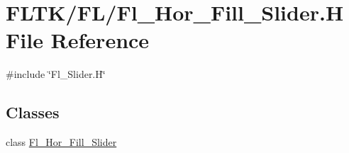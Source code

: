 \hypertarget{_fl___hor___fill___slider_8_h}{}\section{F\+L\+T\+K/\+F\+L/\+Fl\+\_\+\+Hor\+\_\+\+Fill\+\_\+\+Slider.H File Reference}
\label{_fl___hor___fill___slider_8_h}
{\ttfamily \#include \char`\"{}Fl\+\_\+\+Slider.\+H\char`\"{}}\newline
\subsection*{Classes}
\begin{DoxyCompactItemize}
\item 
class \hyperlink{class_fl___hor___fill___slider}{Fl\+\_\+\+Hor\+\_\+\+Fill\+\_\+\+Slider}
\end{DoxyCompactItemize}
